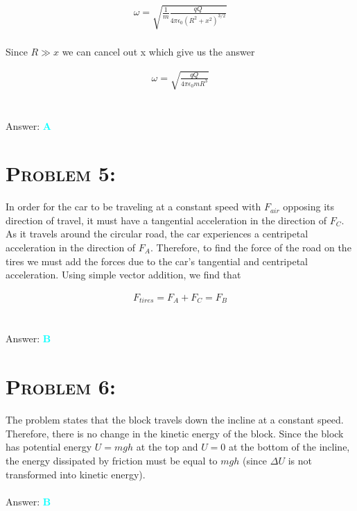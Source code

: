 \documentclass{article}
\begin{document}
\begin{gather}
\omega = \sqrt{\frac{1}{m} \frac{qQ}{4 \pi \epsilon_{0} (R^{2} + x^{2})^{3/2}}}\nonumber
\end{gather}
\\
Since $R \gg x$ we can cancel out x which give us the answer

\begin{gather}
\boxed{\omega = \sqrt{\frac{qQ}{4 \pi \epsilon_{0} m R^{3}}}}\nonumber
\end{gather}
\\\\
Answer: \textbf{\textcolor{cyan}A}\\


\section{\textsc{Problem 5:}} In order for the car to be traveling at a constant speed with $F_{air}$ opposing its direction of travel, it must have a tangential acceleration in the direction of $F_{C}$. As it travels around the circular road, the car experiences a centripetal acceleration in the direction of $F_{A}$. Therefore, to find the force of the road on the tires we must add the forces due to the car's tangential and centripetal acceleration. Using simple vector addition, we find that

\begin{gather}
\boxed{F_{tires} = F_{A} + F_{C} = F_{B}}\nonumber
\end{gather}
\\\\
Answer: \textbf{\textcolor{cyan}B}\\


\section{\textsc{Problem 6:}} The problem states that the block travels down the incline at a constant speed. Therefore, there is no change in the kinetic energy of the block. Since the block has potential energy $U = mgh$ at the top and $U = 0$ at the bottom of the incline, the energy dissipated by friction must be equal to $\boxed{mgh}$ (since $\Delta U$ is not transformed into kinetic energy).
\\\\
Answer: \textbf{\textcolor{cyan}B}\\
\end{document}
